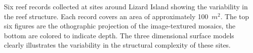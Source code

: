 \label{fig:reef_record_example}Six reef records collected at sites around Lizard Island showing the variability in the reef structure.  Each record covers an area of approximately 100~$m^2$.  The top six figures are the othographic projection of the image-textured mosaics, the bottom are colored to indicate depth. The three dimensional surface models clearly illustrates the variability in the structural complexity of these sites.